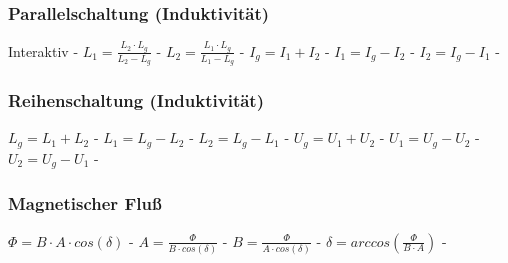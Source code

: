 \subsubsection{Parallelschaltung (Induktivität)} 
\begin{minipage}{0.45\textwidth} 
\end{minipage} 
\begin{minipage}{0.45\textwidth} 
 
\legende{}\end{minipage} 
 
Interaktiv - $ L_{1}  = \frac{L_{2} \cdot L_{g} }{L_{2} -L_{g} } $ - $ L_{2}  = \frac{L_{1} \cdot L_{g} }{L_{1} -L_{g} } $ - $ I_{g}  = I_{1}  + I_{2} $ - $ I_{1}  = I_{g}  - I_{2} $ - $ I_{2}  = I_{g}  - I_{1} $ - \\ 
 
\subsubsection{Reihenschaltung (Induktivität)} 
\begin{minipage}{0.45\textwidth} 
\end{minipage} 
\begin{minipage}{0.45\textwidth} 
 
\legende{}\end{minipage} 
 
$ L_{g}  = L_{1}  + L_{2} $ - $ L_{1}  = L_{g}  - L_{2} $ - $ L_{2}  = L_{g}  - L_{1} $ - $ U_{g}  = U_{1}  + U_{2} $ - $ U_{1}  = U_{g}  - U_{2} $ - $ U_{2}  = U_{g}  - U_{1} $ - \\ 
 
\subsubsection{Magnetischer Fluß} 
\begin{minipage}{0.45\textwidth} 
\end{minipage} 
\begin{minipage}{0.45\textwidth} 
 
\legende{}\end{minipage} 
 
$ \Phi  = B\cdot A\cdot cos(\delta ) $ - $ A = \frac{ \Phi }{B\cdot cos(\delta )} $ - $ B = \frac{ \Phi }{A\cdot cos(\delta )} $ - $ \delta =arccos(\frac{ \Phi }{B\cdot A}) $ - \\ 
 
